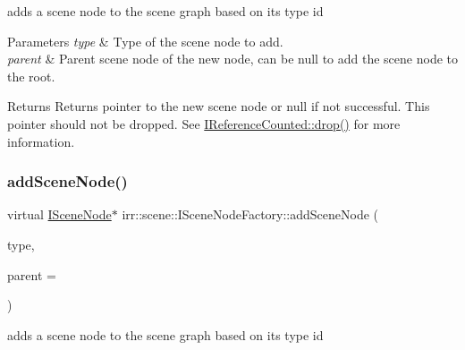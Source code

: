 adds a scene node to the scene graph based on its type id 


\begin{DoxyParams}{Parameters}
{\em type} & Type of the scene node to add. \\
\hline
{\em parent} & Parent scene node of the new node, can be null to add the scene node to the root. \\
\hline
\end{DoxyParams}
\begin{DoxyReturn}{Returns}
Returns pointer to the new scene node or null if not successful. This pointer should not be dropped. See \hyperlink{classirr_1_1IReferenceCounted_a03856a09355b89d178090c4a5f738543}{I\+Reference\+Counted\+::drop()} for more information. 
\end{DoxyReturn}
\mbox{\label{classirr_1_1scene_1_1ISceneNodeFactory_a540de57f9f72a70ee622c536859f5997}} 
\subsubsection{\texorpdfstring{add\+Scene\+Node()}{addSceneNode()}\hspace{0.1cm}{\footnotesize\ttfamily [2/4]}}
{\footnotesize\ttfamily virtual \hyperlink{classirr_1_1scene_1_1ISceneNode}{I\+Scene\+Node}$\ast$ irr\+::scene\+::\+I\+Scene\+Node\+Factory\+::add\+Scene\+Node (\begin{DoxyParamCaption}\item[{\hyperlink{namespaceirr_1_1scene_acad3d7ef92a9807d391ba29120f3b7bd}{E\+S\+C\+E\+N\+E\+\_\+\+N\+O\+D\+E\+\_\+\+T\+Y\+PE}}]{type,  }\item[{\hyperlink{classirr_1_1scene_1_1ISceneNode}{I\+Scene\+Node} $\ast$}]{parent = {} }\end{DoxyParamCaption})\hspace{0.3cm}{\ttfamily [pure virtual]}}



adds a scene node to the scene graph based on its type id 


